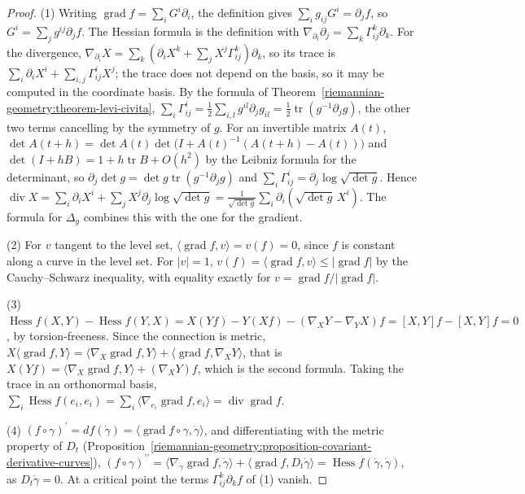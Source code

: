 \begin{proof}
(1) Writing $\operatorname{grad}f = \sum_iG^i\partial_i$, the definition gives $\sum_ig_{ij}G^i = \partial_jf$, so $G^i = \sum_jg^{ij}\partial_jf$. The Hessian formula is the definition with $\nabla_{\partial_i}\partial_j = \sum_k\Gamma^k_{ij}\partial_k$.
For the divergence, $\nabla_{\partial_i}X = \sum_k(\partial_iX^k + \sum_jX^j\Gamma^k_{ij})\partial_k$, so its trace is $\sum_i\partial_iX^i + \sum_{i,j}\Gamma^i_{ij}X^j$; the trace does not depend on the basis, so it may be computed in
the coordinate basis. By the formula of Theorem~\ref{riemannian-geometry:theorem-levi-civita}, $\sum_i\Gamma^i_{ij} = \frac12\sum_{i,l}g^{il}\partial_jg_{il} = \frac12\operatorname{tr}(g^{-1}\partial_jg)$, the other two terms cancelling by
the symmetry of $g$. For an invertible matrix $A(t)$, $\det A(t + h) = \det A(t)\det\bigl(I + A(t)^{-1}(A(t + h) - A(t))\bigr)$ and $\det(I + hB) = 1 + h\operatorname{tr}B + O(h^2)$ by the Leibniz formula for the determinant,
so $\partial_j\det g = \det g\operatorname{tr}(g^{-1}\partial_jg)$ and $\sum_i\Gamma^i_{ij} = \partial_j\log\sqrt{\det g}$. Hence
$\operatorname{div}X = \sum_i\partial_iX^i + \sum_jX^j\partial_j\log\sqrt{\det g} = \frac{1}{\sqrt{\det g}}\sum_i\partial_i(\sqrt{\det g}\,X^i)$. The formula for $\Delta_g$ combines this with the one for the gradient.

(2) For $v$ tangent to the level set, $\langle\operatorname{grad}f, v\rangle = v(f) = 0$, since $f$ is constant along a curve in the level set. For $|v| = 1$, $v(f) = \langle\operatorname{grad}f, v\rangle \leq |\operatorname{grad}f|$ by the
Cauchy--Schwarz inequality, with equality exactly for $v = \operatorname{grad}f/|\operatorname{grad}f|$.

(3) $\operatorname{Hess}f(X, Y) - \operatorname{Hess}f(Y, X) = X(Yf) - Y(Xf) - (\nabla_XY - \nabla_YX)f = [X, Y]f - [X, Y]f = 0$, by torsion-freeness. Since the connection is metric,
$X\langle\operatorname{grad}f, Y\rangle = \langle\nabla_X\operatorname{grad}f, Y\rangle + \langle\operatorname{grad}f, \nabla_XY\rangle$, that is $X(Yf) = \langle\nabla_X\operatorname{grad}f, Y\rangle + (\nabla_XY)f$, which is the second
formula. Taking the trace in an orthonormal basis, $\sum_i\operatorname{Hess}f(e_i, e_i) = \sum_i\langle\nabla_{e_i}\operatorname{grad}f, e_i\rangle = \operatorname{div}\operatorname{grad}f$.

(4) $(f \circ \gamma)^{\prime} = df(\dot\gamma) = \langle\operatorname{grad}f \circ \gamma, \dot\gamma\rangle$, and differentiating with the metric property of $D_t$ (Proposition~\ref{riemannian-geometry:proposition-covariant-derivative-curves}),
$(f \circ \gamma)^{\prime\prime} = \langle\nabla_{\dot\gamma}\operatorname{grad}f, \dot\gamma\rangle + \langle\operatorname{grad}f, D_t\dot\gamma\rangle = \operatorname{Hess}f(\dot\gamma, \dot\gamma)$, as $D_t\dot\gamma = 0$. At a critical point the terms
$\Gamma^k_{ij}\partial_kf$ of (1) vanish.


\end{proof}
